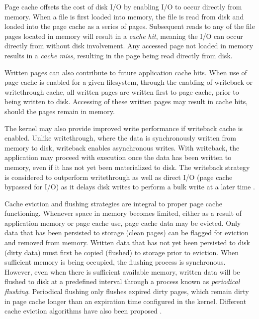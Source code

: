 \documentclass[conference]{IEEEtran}
\begin{document}
        Page cache offsets the cost of disk I/O by enabling I/O to occur directly from memory.
        When a file is first loaded into memory, the file is read from disk and loaded into the page cache as
        a series of pages. Subsequent reads to any of the file pages located in memory will result in
        a \textit{cache hit}, meaning the I/O can occur directly from without disk involvement.
        Any accessed page not loaded in memory results in a \textit{cache miss}, resulting in
        the page being read directly from disk.
        
        Written pages can also contribute to future application cache hits. When use of page cache
        is enabled for a given filesystem, through the enabling of writeback or writethrough cache,
        all written pages are written first to page cache, prior to being written to disk.
        Accessing of these written pages may result in cache hits, should the pages remain in memory.

        The kernel may also provide improved write performance if writeback cache is enabled. Unlike writethrough,
        where the data is synchronously written from memory to disk, writeback enables asynchronous writes.
        With writeback, the application may proceed with execution once the data has been
        written to memory, even if it has not yet been materialized to disk.  
        The writeback strategy is considered to outperform writethrough as well as
        direct I/O (page cache bypassed for I/O) as it delays disk writes to perform a bulk write at a later time
        \cite{linuxdev3rd2010}.

        Cache eviction and flushing strategies are integral to proper page cache functioning.
        Whenever space in memory becomes limited, either as a result of application memory
        or page cache use, page cache data may be evicted. Only data that
        has been persisted to storage (clean pages) can be flagged for eviction and removed from
        memory. Written data that has not yet been persisted to disk (dirty data) must first
        be copied (flushed) to storage prior to eviction. When sufficient memory is
        being occupied, the flushing process is synchronous. However, even when
        there is sufficient available memory, written data will be flushed to disk
        at a predefined interval through a process known as \textit{periodical flushing}.
        Periodical flushing only flushes expired dirty pages, which remain dirty in
        page cache longer than an expiration time configured in the kernel.
        Different cache eviction algorithms have also been proposed
        \cite{owda2014comparison}.
\end{document}

